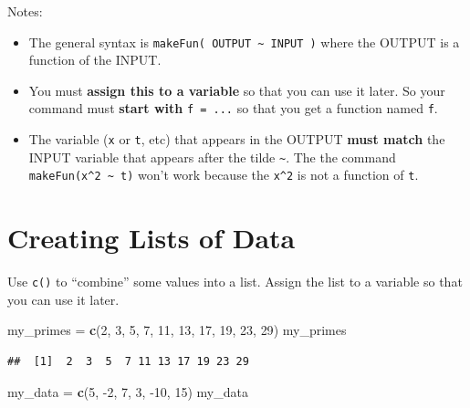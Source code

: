 \documentclass[
]{book}
\newenvironment{Shaded}{\begin{snugshade}}{\end{snugshade}}
\newcommand{\DecValTok}[1]{\textcolor[rgb]{0.00,0.00,0.81}{#1}}
\newcommand{\KeywordTok}[1]{\textcolor[rgb]{0.13,0.29,0.53}{\textbf{#1}}}
\newcommand{\NormalTok}[1]{#1}
\newcommand{\StringTok}[1]{\textcolor[rgb]{0.31,0.60,0.02}{#1}}
\providecommand{\tightlist}{%
  \setlength{\itemsep}{0pt}\setlength{\parskip}{0pt}}
\begin{document}
Notes:

\begin{itemize}
\tightlist
\item
  The general syntax is \texttt{makeFun(\ OUTPUT\ \textasciitilde{}\ INPUT\ )} where the OUTPUT is a function of the INPUT.
\item
  You must \textbf{assign this to a variable} so that you can use it later. So your command must \textbf{start with} \texttt{f\ =\ ...} so that you get a function named \texttt{f}.
\item
  The variable (\texttt{x} or \texttt{t}, etc) that appears in the OUTPUT \textbf{must match} the INPUT variable that appears after the tilde \texttt{\textasciitilde{}}. The the command \texttt{makeFun(x\^{}2\ \textasciitilde{}\ t)} won't work because the \texttt{x\^{}2} is not a function of \texttt{t}.
\end{itemize}

\hypertarget{creating-lists-of-data}{%
\section{Creating Lists of Data}\label{creating-lists-of-data}}

Use \texttt{c()} to ``combine'' some values into a list. Assign the list to a variable so that you can use it later.

\begin{Shaded}
\begin{Highlighting}[]
\NormalTok{my_primes =}\StringTok{ }\KeywordTok{c}\NormalTok{(}\DecValTok{2}\NormalTok{, }\DecValTok{3}\NormalTok{, }\DecValTok{5}\NormalTok{, }\DecValTok{7}\NormalTok{, }\DecValTok{11}\NormalTok{, }\DecValTok{13}\NormalTok{, }\DecValTok{17}\NormalTok{, }\DecValTok{19}\NormalTok{, }\DecValTok{23}\NormalTok{, }\DecValTok{29}\NormalTok{)}
\NormalTok{my_primes}
\end{Highlighting}
\end{Shaded}

\begin{verbatim}
##  [1]  2  3  5  7 11 13 17 19 23 29
\end{verbatim}

\begin{Shaded}
\begin{Highlighting}[]
\NormalTok{my_data =}\StringTok{ }\KeywordTok{c}\NormalTok{(}\DecValTok{5}\NormalTok{, }\DecValTok{-2}\NormalTok{, }\DecValTok{7}\NormalTok{, }\DecValTok{3}\NormalTok{, }\DecValTok{-10}\NormalTok{, }\DecValTok{15}\NormalTok{)}
\NormalTok{my_data}
\end{Highlighting}
\end{Shaded}
\end{document}
